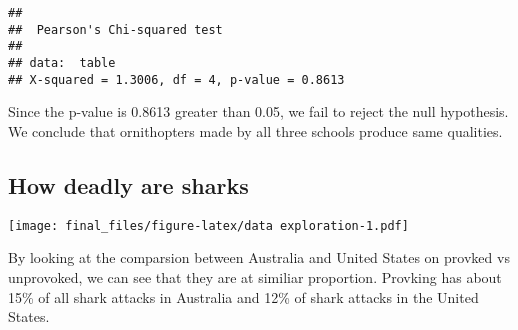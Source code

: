 \documentclass[]{article}
\newenvironment{Shaded}{\begin{snugshade}}{\end{snugshade}}
\newcommand{\KeywordTok}[1]{\textcolor[rgb]{0.13,0.29,0.53}{\textbf{#1}}}
\newcommand{\DataTypeTok}[1]{\textcolor[rgb]{0.13,0.29,0.53}{#1}}
\newcommand{\DecValTok}[1]{\textcolor[rgb]{0.00,0.00,0.81}{#1}}
\newcommand{\StringTok}[1]{\textcolor[rgb]{0.31,0.60,0.02}{#1}}
\newcommand{\ControlFlowTok}[1]{\textcolor[rgb]{0.13,0.29,0.53}{\textbf{#1}}}
\newcommand{\OperatorTok}[1]{\textcolor[rgb]{0.81,0.36,0.00}{\textbf{#1}}}
\newcommand{\NormalTok}[1]{#1}
\begin{document}
\begin{verbatim}
## 
##  Pearson's Chi-squared test
## 
## data:  table
## X-squared = 1.3006, df = 4, p-value = 0.8613
\end{verbatim}

Since the p-value is 0.8613 greater than 0.05, we fail to reject the
null hypothesis. We conclude that ornithopters made by all three schools
produce same qualities.

\subsection{How deadly are sharks}\label{how-deadly-are-sharks}

\begin{Shaded}
\end{Shaded}

\texttt{[image: final\_files/figure-latex/data exploration-1.pdf]}

By looking at the comparsion between Australia and United States on
provked vs unprovoked, we can see that they are at similiar proportion.
Provking has about 15\% of all shark attacks in Australia and 12\% of
shark attacks in the United States.
\end{document}
